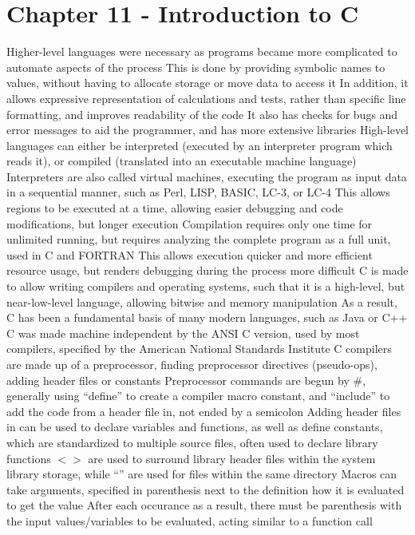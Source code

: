 \documentclass[11 pt, twoside]{article}
\newenvironment{outline*}
{
	\begin{outline}[enumerate]
	}
	{\end{outline}
}
\begin{document}
\section{Chapter 11 - Introduction to C}
\begin{outline*}
\1 Higher-level languages were necessary as programs became more complicated to automate aspects of the process
\2 This is done by providing symbolic names to values, without having to allocate storage or move data to access it
\2 In addition, it allows expressive representation of calculations and tests, rather than specific line formatting, and improves readability of the code
\2 It also has checks for bugs and error messages to aid the programmer, and has more extensive libraries
\1 High-level languages can either be interpreted (executed by an interpreter program which reads it), or compiled (translated into an executable machine language)
\2 Interpreters are also called virtual machines, executing the program as input data in a sequential manner, such as Perl, LISP, BASIC, LC-3, or LC-4
\3 This allows regions to be executed at a time, allowing easier debugging and code modifications, but longer execution
\2 Compilation requires only one time for unlimited running, but requires analyzing the complete program as a full unit, used in C and FORTRAN
\3 This allows execution quicker and more efficient resource usage, but renders debugging during the process more difficult
\1 C is made to allow writing compilers and operating systems, such that it is a high-level, but near-low-level language, allowing bitwise and memory manipulation
\2 As a result, C has been a fundamental basis of many modern languages, such as Java or C++
\2 C was made machine independent by the ANSI C version, used by most compilers, specified by the American National Standards Institute
\1 C compilers are made up of a preprocessor, finding preprocessor directives (pseudo-ops), adding header files or constants
\2 Preprocessor commands are begun by \#, generally using ``define'' to create a compiler macro constant, and ``include'' to add the code from a header file in, not ended by a semicolon
\3 Adding header files in can be used to declare variables and functions, as well as define constants, which are standardized to multiple source files, often used to declare library functions
\3 $<>$ are used to surround library header files within the system library storage, while ``'' are used for files within the same directory
\3 Macros can take arguments, specified in parenthesis next to the definition how it is evaluated to get the value
\4 After each occurance as a result, there must be parenthesis with the input values/variables to be evaluated, acting similar to a function call

\end{outline*}
\end{document}
